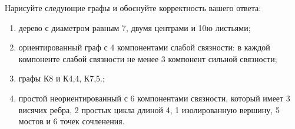 \question 
Нарисуйте следующие графы и обоснуйте корректность вашего ответа:
\begin{enumerate}
\item  дерево с диаметром равным 7, двумя центрами  и  10ю листьями;
\item  ориентированный граф с 4 компонентами слабой связности: в  каждой компоненте слабой связности не менее 3 компонент сильной связности;
\item  графы К8 и К4,4, К7,5.;
\item  простой неориентированный с 6 компонентами связности, который имеет 3 висячих ребра, 2 простых цикла длиной 4, 1 изолированную вершину, 5 мостов и 6 точек сочленения.
\end{enumerate}




